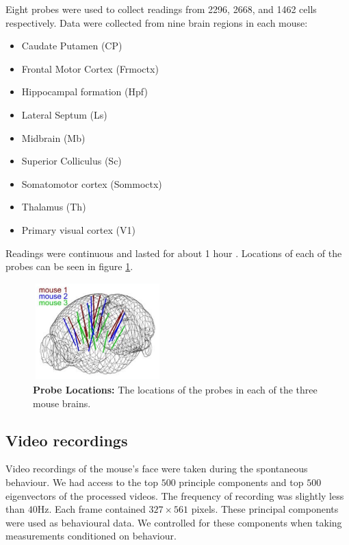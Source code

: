 \documentclass[a4paper,12pt]{article}
\theoremstyle{definition}
\begin{document}
    Eight probes were used to collect readings from 2296, 2668, and 1462 cells respectively. Data were collected from nine brain regions in each mouse:
    \begin{itemize}
        \item Caudate Putamen (CP)
        \item Frontal Motor Cortex (Frmoctx)
        \item Hippocampal formation (Hpf)
        \item Lateral Septum (Ls)
        \item Midbrain (Mb)
        \item Superior Colliculus (Sc)
        \item Somatomotor cortex (Sommoctx)
        \item Thalamus (Th)
        \item Primary visual cortex (V1)
    \end{itemize}
    Readings were continuous and lasted for about 1 hour \cite{stringer}. Locations of each of the probes can be seen in figure \ref{fig:probe_locations}.

    \begin{figure}[h]
        \centering
        \includegraphics[width=5cm,height=3.75cm]{figures/probe_locations_stringer.png}
        \caption{\textbf{Probe Locations:} The locations of the probes in each of the three mouse brains\cite{stringer}.}
        \label{fig:probe_locations}
    \end{figure}

    \subsection{Video recordings}\label{sec:video_recordings}
    Video recordings of the mouse's face were taken during the spontaneous behaviour. We had access to the top $500$ principle components and top $500$ eigenvectors of the processed videos. The frequency of recording was slightly less than $40$Hz. Each frame contained $327 \times 561$ pixels. These principal components were used as behavioural data. We controlled for these components when taking measurements conditioned on behaviour.
\end{document}
